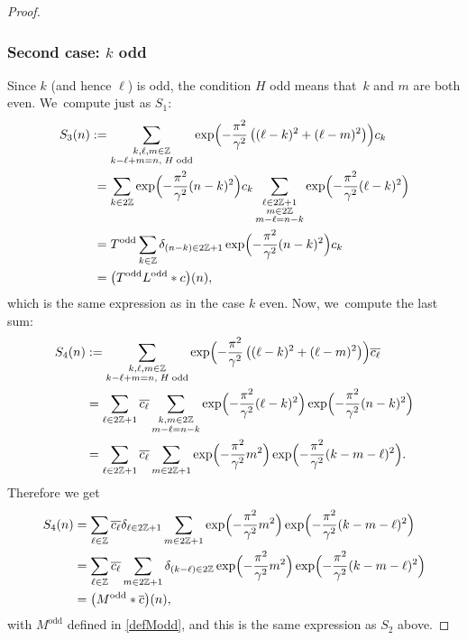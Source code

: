 \documentclass[JEP,XML,SOM,Unicode,NoFloatCountersInSection,published]{cedram}
\theoremstyle{definition}
\let\EE\exp
\let\ov\overline
\newcommand\Z{\mathbb Z}
\newcommand{\pa}[1]{\left(#1\right)}
\begin{document}
\begin{proof}
\subsubsection*{Second case: $k$ odd} Since $k$ (and hence $\ell$) is odd, the condition $H$ odd means that~$k$ and $m$ are both even. We~compute just as $S_1$:
\begin{align*}
S_3(n) &:= \sum_{\substack { k, \ell, m \in \Z \\ k-\ell+m=n, \;H\; \text{odd}}}\EE\Bigl(-\frac{\pi^2}{\gamma^2}\pa{(\ell-k)^2+(\ell-m)^2}\Bigr)c_{k} \\
&\hphantom{:}= \sum_{k\in 2\Z}\EE\Bigl(-\frac{\pi^2}{\gamma^2}(n-k)^2\Bigr)c_{k} \sum_{\substack {\ell \in 2\Z+1 \\ m \in 2\Z \\ m-\ell = n-k}}\EE\Bigl(-\frac{\pi^2}{\gamma^2}(\ell-k)^2\Bigr) \\
&\hphantom{:}= T^{\text{odd}}\sum_{k\in \Z}\delta_{(n-k)\in2\Z+1}\EE\Bigl(-\frac{\pi^2}{\gamma^2}(n-k)^2\Bigr)c_{k} \\
&\hphantom{:}= \bigl(T^{\text{odd}}L^{\text{odd}} * c\bigr)(n),
\end{align*}
which is the same expression as in the case $k$ even. Now, we~compute the last sum:
\begin{align*}
S_4(n) &:= \sum_{\substack {k, \ell, m \in \Z \\ k-\ell+m=n, \;H\; \text{odd}}}\EE\Bigl(-\frac{\pi^2}{\gamma^2}\pa{(\ell-k)^2+(\ell-m)^2}\Bigr)\ov{c_{\ell}} \\
&= \sum_{\ell\in 2\Z+1}\ov{c_{\ell}} \sum_{\substack {k,m \in 2\Z \\ m-\ell = n-k}}\EE\Bigl(-\frac{\pi^2}{\gamma^2}(\ell-k)^2\Bigr) \EE\Bigl(-\frac{\pi^2}{\gamma^2}(n-k)^2\Bigr) \\
&= \sum_{\ell\in 2\Z+1}\ov{c_{\ell}} \sum_{m \in 2\Z+1}\EE\Bigl(-\frac{\pi^2}{\gamma^2}m^2\Bigr) \EE\Bigl(-\frac{\pi^2}{\gamma^2}(k-m-\ell)^2\Bigr).
\end{align*}
Therefore we get
\begin{align*}
S_4(n) &= \sum_{\ell\in \Z}\ov{c_{\ell}}\delta_{\ell\in2\Z+1} \sum_{m \in 2\Z+1}\EE\Bigl(-\frac{\pi^2}{\gamma^2}m^2\Bigr)\EE\Bigl(-\frac{\pi^2}{\gamma^2}(k-m-\ell)^2\Bigr) \\
&= \sum_{\ell\in \Z}\ov{c_{\ell}} \sum_{m \in 2\Z+1}\delta_{(k-\ell)\in2\Z}\EE\Bigl(-\frac{\pi^2}{\gamma^2}m^2\Bigr) \EE\Bigl(-\frac{\pi^2}{\gamma^2}(k-m-\ell)^2\Bigr)\\
& =\bigl(M^{\text{odd}} * \overline{c}\bigr)(n),
\end{align*}
with $M^{\text{odd}}$ defined in \eqref{defModd}, and this is the same expression as $S_2$ above.


\end{proof}
\end{document}
